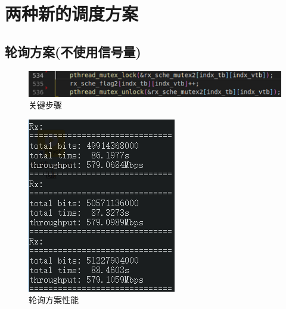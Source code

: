 \documentclass{article}
\begin{document}
\section{两种新的调度方案}
\subsection{轮询方案(不使用信号量)}
\begin{figure}[H]
	\centering
	\includegraphics[width = \textwidth]{poll0.png}
	\caption{关键步骤}
\end{figure}
\begin{figure}[H]
	\centering
	\begin{minipage}[t]{0.48\textwidth}
		\centering
		\includegraphics[width = \textwidth]{pollsta.png}
		\caption{轮询方案性能}
	\end{minipage}
	\begin{minipage}[t]{0.48\textwidth}
		\centering

\end{minipage}
\end{figure}
\end{document}

